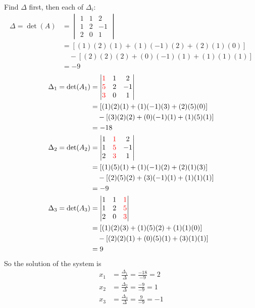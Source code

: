 \begin{solution}
Find $\Delta$ first, then each of $\Delta_i$:
\begin{align*}
\Delta = \det(A) &=
\begin{vmatrix}
1 & 1 & 2 \\
1 & 2 & -1 \\
2 & 0 & 1   
\end{vmatrix} \\
&= [(1)(2)(1) + (1)(-1)(2) + (2)(1)(0)] \\
&\quad - [(2)(2)(2) + (0)(-1)(1) + (1)(1)(1)] \\
&= -9
\end{align*}
\begin{align*}
\Delta_1 = \det(A_1) &=
\begin{vmatrix}
\mathcolor{red}{1} & 1 & 2 \\
\mathcolor{red}{5} & 2 & -1 \\
\mathcolor{red}{3} & 0 & 1    
\end{vmatrix} \\
&= [(1)(2)(1) + (1)(-1)(3) + (2)(5)(0)] \\
&\quad - [(3)(2)(2) + (0)(-1)(1) + (1)(5)(1)] \\
&= -18 \\
\Delta_2 = \det(A_2) &=
\begin{vmatrix}
1 & \mathcolor{red}{1} & 2 \\
1 & \mathcolor{red}{5} & -1 \\
2 & \mathcolor{red}{3} & 1   
\end{vmatrix} \\
&= [(1)(5)(1) + (1)(-1)(2) + (2)(1)(3)] \\
&\quad - [(2)(5)(2) + (3)(-1)(1) + (1)(1)(1)] \\
&= -9 \\
\Delta_3 = \det(A_3) &=
\begin{vmatrix}
1 & 1 & \mathcolor{red}{1} \\
1 & 2 & \mathcolor{red}{5} \\
2 & 0 & \mathcolor{red}{3}   
\end{vmatrix} \\
&= [(1)(2)(3) + (1)(5)(2) + (1)(1)(0)] \\
&\quad - [(2)(2)(1) + (0)(5)(1) + (3)(1)(1)] \\
&= 9
\end{align*}
So the solution of the system is
\begin{align*}
x_1 &= \frac{\Delta_1}{\Delta} = \frac{-18}{-9} = 2 \\
x_2 &= \frac{\Delta_2}{\Delta} = \frac{-9}{-9} = 1 \\
x_3 &= \frac{\Delta_3}{\Delta} = \frac{9}{-9} = -1 
\end{align*}
\end{solution}
